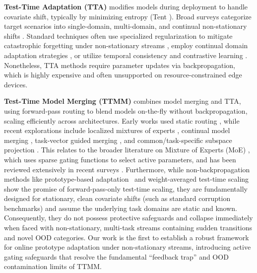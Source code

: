 \documentclass{article}
\theoremstyle{plain}
\theoremstyle{definition}
\theoremstyle{remark}
\begin{document}
\textbf{Test-Time Adaptation (TTA)} modifies models during deployment to handle covariate shift, typically by minimizing entropy (Tent \cite{tent}). Broad surveys categorize target scenarios into single-domain, multi-domain, and continual non-stationary shifts \cite{tta_survey_2024, beyond_model_adaptation_2024, ctta_survey_2026}. Standard techniques often use specialized regularization to mitigate catastrophic forgetting under non-stationary streams \cite{eata, rotta, sar}, employ continual domain adaptation strategies \cite{cotta, lame, ecotta_2023}, or utilize temporal consistency \cite{note_tta_2022} and contrastive learning \cite{contrastive_tta_2022}. Nonetheless, TTA methods require parameter updates via backpropagation, which is highly expensive and often unsupported on resource-constrained edge devices.

\textbf{Test-Time Model Merging (TTMM)} combines model merging and TTA, using forward-pass routing to blend models on-the-fly without backpropagation, scaling efficiently across architectures. Early works used static routing \cite{df_bayes_ttmm, cl_w_fisher, kt_fisher}, while recent explorations include localized mixtures of experts \cite{local_moe}, continual model merging \cite{mingle}, task-vector guided merging \cite{whoever_started}, and common/task-specific subspace projection \cite{no_task_left_behind}. This relates to the broader literature on Mixture of Experts (MoE) \cite{outrageously_large_moe, gshard, switch_transformer, vlm_moe}, which uses sparse gating functions to select active parameters, and has been reviewed extensively in recent surveys \cite{moe_survey_2025, moe_survey_algorithms_2025, fedus2022review}. Furthermore, while non-backpropagation methods like prototype-based adaptation~\cite{proto_tta_2023} and weight-averaged test-time scaling~\cite{watt_clip_2024} show the promise of forward-pass-only test-time scaling, they are fundamentally designed for stationary, clean covariate shifts (such as standard corruption benchmarks) and assume the underlying task domains are static and known. Consequently, they do not possess protective safeguards and collapse immediately when faced with non-stationary, multi-task streams containing sudden transitions and novel OOD categories. Our work is the first to establish a robust framework for online prototype adaptation under non-stationary streams, introducing active gating safeguards that resolve the fundamental ``feedback trap'' and OOD contamination limits of TTMM.
\end{document}
